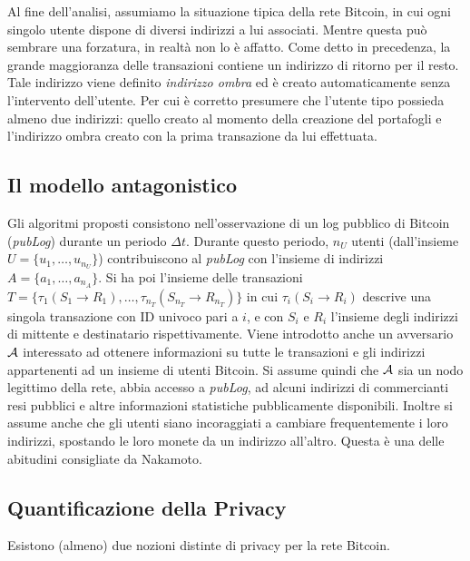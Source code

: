 Al fine dell'analisi, assumiamo la situazione tipica della rete Bitcoin, in cui ogni singolo utente dispone di diversi indirizzi a lui associati. Mentre questa può sembrare una forzatura, in realtà non lo è affatto. Come detto in precedenza, la grande maggioranza delle transazioni contiene un indirizzo di ritorno per il resto. Tale indirizzo viene definito \emph{indirizzo ombra} ed è creato automaticamente senza l'intervento dell'utente. Per cui è corretto presumere che l'utente tipo possieda almeno due indirizzi: quello creato al momento della creazione del portafogli e l'indirizzo ombra creato con la prima transazione da lui effettuata.

\subsection{Il modello antagonistico}\label{il-modello-antagonistico}

Gli algoritmi proposti consistono nell'osservazione di un log pubblico di Bitcoin (\emph{pubLog}) durante un periodo $\Delta t$. Durante questo periodo, $n_U $ utenti (dall'insieme $U = \{u_1, \ldots, u_{n_U}\}$) contribuiscono al \emph{pubLog} con l'insieme di indirizzi $A = \{a_1, \ldots, a_{n_A}\}$. Si ha poi l'insieme delle transazioni $T = \{ \tau_1 (S_1 \rightarrow R_1), \ldots , \tau_{n_T}(S_{n_T} \rightarrow R_{n_T}) \} $ in cui $\tau_i (S_i \rightarrow R_i)$ descrive una singola transazione con ID univoco pari a $i$, e con $S_i$ e $R_i$ l'insieme degli indirizzi di mittente e destinatario rispettivamente. Viene introdotto anche un avversario $\mathcal{A}$ interessato ad ottenere informazioni su tutte le transazioni e gli indirizzi appartenenti ad un insieme di utenti Bitcoin. Si assume quindi che $\mathcal{A}$ sia un nodo legittimo della rete, abbia accesso a \emph{pubLog}, ad alcuni indirizzi di commercianti resi pubblici e altre informazioni statistiche pubblicamente disponibili. Inoltre si assume anche che gli utenti siano incoraggiati a cambiare frequentemente i loro indirizzi, spostando le loro monete da un indirizzo all'altro. Questa è una delle abitudini consigliate da Nakamoto.

\subsection{Quantificazione della Privacy}\label{quantificazione-della-privacy}

Esistono (almeno) due nozioni distinte di privacy per la rete Bitcoin.


